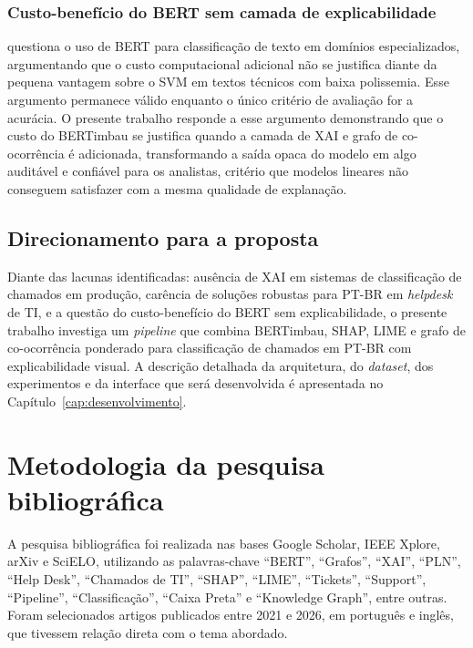 \documentclass[
    12pt,                %
    openright,           %
    oneside,             %
    a4paper,             %
    english,             %
    brazil               %
]{abntex2}
\begin{document}
\subsubsection{Custo-benefício do BERT sem camada de explicabilidade}
\label{subsubsec:lacuna_wahba}

 questiona o uso de BERT para classificação de texto em domínios especializados, argumentando que o custo computacional adicional não se justifica diante da pequena vantagem sobre o SVM em textos técnicos com baixa polissemia. Esse argumento permanece válido enquanto o único critério de avaliação for a acurácia. O presente trabalho responde a esse argumento demonstrando que o custo do BERTimbau se justifica quando a camada de XAI e grafo de co-ocorrência é adicionada, transformando a saída opaca do modelo em algo auditável e confiável para os analistas, critério que modelos lineares não conseguem satisfazer com a mesma qualidade de explanação.

\subsection{Direcionamento para a proposta}
\label{subsec:sintese_direcao}

Diante das lacunas identificadas: ausência de XAI em sistemas de classificação de chamados em produção, carência de soluções robustas para PT-BR em \textit{helpdesk} de TI, e a questão do custo-benefício do BERT sem explicabilidade, o presente trabalho investiga um \textit{pipeline} que combina BERTimbau, SHAP, LIME e grafo de co-ocorrência ponderado para classificação de chamados em PT-BR com explicabilidade visual. A descrição detalhada da arquitetura, do \textit{dataset}, dos experimentos e da interface que será desenvolvida é apresentada no Capítulo~\ref{cap:desenvolvimento}.

\section{Metodologia da pesquisa bibliográfica}
\label{sec:metodologia_pesquisa}

A pesquisa bibliográfica foi realizada nas bases Google Scholar, IEEE Xplore, arXiv e SciELO, utilizando as palavras-chave ``BERT'', ``Grafos'', ``XAI'', ``PLN'', ``Help Desk'', ``Chamados de TI'', ``SHAP'', ``LIME'', ``Tickets'', ``Support'', ``Pipeline'', ``Classificação'', ``Caixa Preta'' e ``Knowledge Graph'', entre outras. Foram selecionados artigos publicados entre 2021 e 2026, em português e inglês, que tivessem relação direta com o tema abordado.
\end{document}
